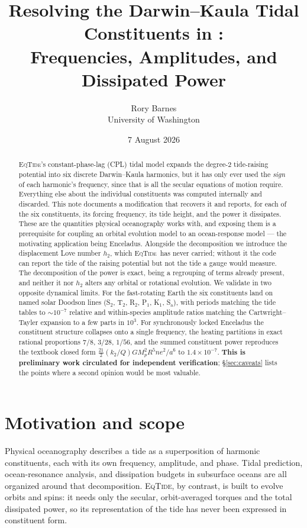 \documentclass[11pt]{article}
\title{Resolving the Darwin--Kaula Tidal Constituents in \eqtide:\\
Frequencies, Amplitudes, and Dissipated Power}
\author{Rory Barnes\\\small University of Washington}
\date{7 August 2026}
\newcommand{\eqtide}{\textsc{EqTide}}
\begin{document}
\maketitle

\begin{abstract}
\noindent
\eqtide's constant-phase-lag (CPL) tidal model expands the degree-2
tide-raising potential into six discrete Darwin--Kaula harmonics, but it has
only ever used the \emph{sign} of each harmonic's frequency, since that is all
the secular equations of motion require. Everything else about the individual
constituents was computed internally and discarded. This note documents a
modification that recovers it and reports, for each of the six constituents,
its forcing frequency, its tide height, and the power it dissipates. These are
the quantities physical oceanography works with, and exposing them is a
prerequisite for coupling an orbital evolution model to an ocean-response
model --- the motivating application being Enceladus. Alongside the
decomposition we introduce the displacement Love number $h_2$, which \eqtide\
has never carried; without it the code can report the tide of the raising
potential but not the tide a gauge would measure. The decomposition of the
power is exact, being a regrouping of terms already present, and neither it
nor $h_2$ alters any orbital or rotational evolution. We validate in two
opposite dynamical limits. For the fast-rotating Earth the six constituents
land on named solar Doodson lines (S$_2$, T$_2$, R$_2$, P$_1$, K$_1$,
S$_\mathrm{a}$), with periods matching the tide tables to $\sim\!10^{-7}$
relative and within-species amplitude ratios matching the Cartwright--Tayler
expansion to a few parts in $10^3$. For synchronously locked Enceladus the
constituent structure collapses onto a single frequency, the heating
partitions in exact rational proportions $7/8$, $3/28$, $1/56$, and the summed
constituent power reproduces the textbook closed form
$\tfrac{21}{2}(k_2/Q)GM_p^2R^5ne^2/a^6$ to $1.4\times10^{-7}$.
\textbf{This is preliminary work circulated for independent verification};
\S\ref{sec:caveats} lists the points where a second opinion would be most
valuable.
\end{abstract}

\section{Motivation and scope}

Physical oceanography describes a tide as a superposition of harmonic
constituents, each with its own frequency, amplitude, and phase. Tidal
prediction, ocean-resonance analysis, and dissipation budgets in subsurface
oceans are all organized around that decomposition. \eqtide, by contrast, is
built to evolve orbits and spins: it needs only the secular, orbit-averaged
torques and the total dissipated power, so its representation of the tide has
never been expressed in constituent form.
\end{document}
